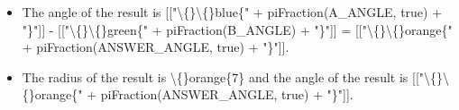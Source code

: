 \documentclass{article}
\begin{document}
\begin{itemize}
                    
                        [["\textbackslash\{\}\textbackslash\{\}orange\{" + piFraction((A\_ANGLE\_NUMERATOR - B\_ANGLE\_NUMERATOR ) * PI * 2 / DENOMINATOR, true) + "\}"]] + 2 \textbackslash\{\}pi = [["\textbackslash\{\}\textbackslash\{\}orange\{" + piFraction(ANSWER\_ANGLE, true) + "\}"]]
  \item The angle of the result is [["\textbackslash\{\}\textbackslash\{\}blue\{" + piFraction(A\_ANGLE, true) + "\}"]] - [["\textbackslash\{\}\textbackslash\{\}green\{" + piFraction(B\_ANGLE) + "\}"]] = [["\textbackslash\{\}\textbackslash\{\}orange\{" + piFraction(ANSWER\_ANGLE, true) + "\}"]].
  \item The radius of the result is \textbackslash\{\}orange\{7\}
                    and the angle of the result is [["\textbackslash\{\}\textbackslash\{\}orange\{" + piFraction(ANSWER\_ANGLE, true) + "\}"]].
\end{itemize}
\end{document}
